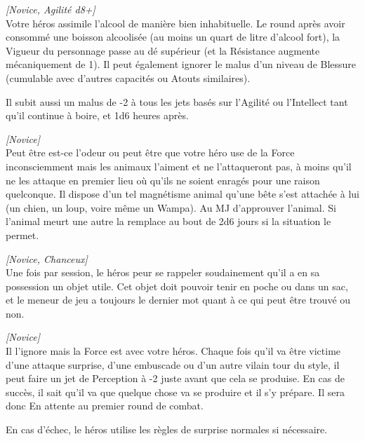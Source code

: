 \begin{description}[align=left]
    \item [Courage liquide]
        \emph{[Novice, Agilité d8+]}\\
        Votre héros assimile l’alcool de manière bien inhabituelle. Le round après avoir consommé une boisson alcoolisée (au moins un quart de litre d’alcool fort), la Vigueur du personnage passe au dé supérieur (et la Résistance augmente mécaniquement de 1). Il peut également ignorer le malus d’un niveau de Blessure (cumulable avec d’autres capacités ou Atouts similaires).

        Il subit aussi un malus de -2 à tous les jets basés sur l’Agilité ou l’Intellect tant qu’il continue à boire, et 1d6 heures après.

    \item [Maître des bêtes]
        \emph{[Novice]}\\
        Peut être est-ce l’odeur ou peut être que votre héro use de la Force inconsciemment mais les animaux l’aiment et ne l’attaqueront pas, à moins qu’il ne les attaque en premier lieu où qu’ils ne soient enragés pour une raison quelconque. Il dispose d’un tel magnétisme animal qu’une bête s’est attachée à lui (un chien, un loup, voire même un Wampa). Au MJ d’approuver l’animal. Si l’animal meurt une autre la remplace au bout de 2d6 jours si la situation le permet.

    \item [Recycleur]
        \emph{[Novice, Chanceux]}\\
        Une fois par session, le héros peur se rappeler soudainement qu’il a en sa possession un objet utile. Cet objet doit pouvoir tenir en poche ou dans un sac, et le meneur de jeu a toujours le dernier mot quant à ce qui peut être trouvé ou non.

    \item [Sixième sens]
        \emph{[Novice]}\\
        Il l’ignore mais la Force est avec votre héros. Chaque fois qu’il va être victime d’une attaque surprise, d’une embuscade ou d’un autre vilain tour du style, il peut faire un jet de Perception à -2 juste avant que cela se produise. En cas de succès, il sait qu’il va que quelque chose va se produire et il s’y prépare. Il sera donc En attente au premier round de combat.

        En cas d’échec, le héros utilise les règles de surprise normales si nécessaire.
\end{description}

